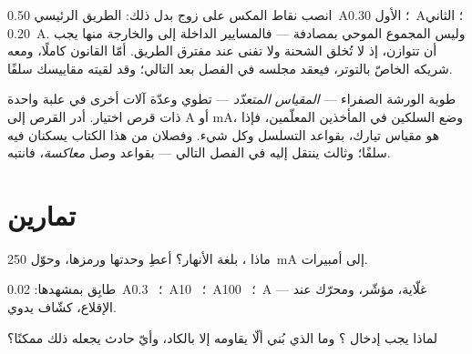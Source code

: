 \begin{example}\label{ex:g8:intensity-ammeter:junction}
انصب نقاط المكس على زوج  بدل ذلك: الطريق الرئيسي
\qty{0.50}{A}؛  الأول \qty{0.30}{A}؛  الثاني
\qty{0.20}{A}. وليس المجموع الموحي بمصادفة --- فالمسايير
الداخلة إلى  والخارجة منها يجب أن تتوازن، إذ لا تُخلق
الشحنة ولا تفنى عند مفترق الطريق. أمّا القانون كاملًا، ومعه
شريكه الخاصّ بالتوتر، فيعقد مجلسه في الفصل بعد التالي؛ وقد
لقيته مقاييسك سلفًا.
\end{example}

\begin{remark}\label{rem:g8:intensity-ammeter:multimeter}
طوبة الورشة الصفراء --- \emph{المقياس المتعدّد} --- تطوي  وعدّة آلات أخرى في علبة واحدة ذات قرص اختيار. أدر القرص
إلى \unit{A} أو \unit{mA}، وضع السلكين في المأخذين المعلّمين،
فإذا هو مقياس تيارك، بقواعد التسلسل وكل شيء. وفصلان من هذا
الكتاب يسكنان فيه سلفًا؛ وثالث ينتقل إليه في الفصل التالي ---
بقواعد وصل \emph{معاكسة}، فانتبه.
\end{remark}

\section{تمارين}

\begin{exercise}[$\star$]\label{exo:g8:intensity-ammeter:1}
ماذا  ، بلغة الأنهار؟ أعطِ وحدتها ورمزها، وحوّل
\qty{250}{mA} إلى أمبيرات.
\end{exercise}

\begin{exercise}[$\star$]\label{exo:g8:intensity-ammeter:2}
طابِق  بمشهدها: \qty{0.02}{A}؛ \ \qty{0.3}{A}؛ \
\qty{10}{A}؛ \ \qty{100}{A} --- غلّاية،  مؤشّر، ومحرّك
عند الإقلاع، \omterm{def:g3:first-electric-circuit:bulb}{ومصباح} كشّاف يدوي.
\end{exercise}

\begin{exercise}[$\star$]\label{exo:g8:intensity-ammeter:3}
لماذا يجب إدخال  ؟ وما الذي بُني ألّا
يقاومه إلا بالكاد، وأيّ حادث يجعله ذلك ممكنًا؟
\end{exercise}


